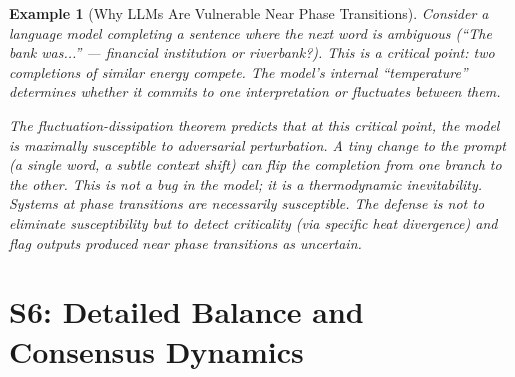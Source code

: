 \documentclass[11pt,letterpaper]{article}
\newtheorem{example}[conjecture]{Example}
\begin{document}
\begin{example}[Why LLMs Are Vulnerable Near Phase Transitions]
Consider a language model completing a sentence where the next word is 
ambiguous (``The bank was...'' --- financial institution or riverbank?). 
This is a critical point: two completions of similar energy compete. 
The model's internal ``temperature'' determines whether it commits to one 
interpretation or fluctuates between them.

The fluctuation-dissipation theorem predicts that at this critical point, 
the model is maximally susceptible to adversarial perturbation. A tiny 
change to the prompt (a single word, a subtle context shift) can flip the 
completion from one branch to the other. This is not a bug in the model; 
it is a thermodynamic inevitability. Systems at phase transitions are 
\emph{necessarily} susceptible. The defense is not to eliminate 
susceptibility but to \emph{detect} criticality (via specific heat 
divergence) and flag outputs produced near phase transitions as uncertain.
\end{example}

\newpage
\section{S6: Detailed Balance and Consensus Dynamics}
\end{document}
